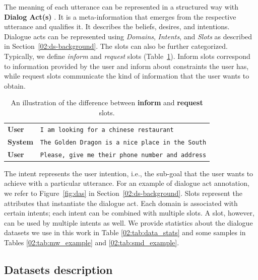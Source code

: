\begin{enumerate}
The meaning of each utterance can be represented in a structured way with \textbf{Dialog Act(s)} \cite{Weisser2016}.
It is a meta-information that emerges from the respective utterance and qualifies it. It describes the beliefs, desires, and intentions.
Dialogue acts can be represented using \emph{Domains}, \emph{Intents}, and \emph{Slots} as described in Section~\ref{02:ds-background}.
The slots can also be further categorized.
Typically, we define \emph{inform} and \emph{request} slots (Table~\ref{02:tab:inf-req}). Inform slots correspond to information provided by the user and inform about constraints the user has, while request slots communicate the kind of information that the user wants to obtain.
\begin{table}[tp]
    \centering
    \begin{tabular}{l|l}
    \toprule
         \textbf{User} & \texttt{I am looking for a {\color{cyan!80!yellow!80!black!100 }chinese} restaurant} \\
         \textbf{System} & \texttt{The Golden Dragon is a nice place in the South} \\
         \textbf{User} & \texttt{Please, give me their {\color{orange!50!yellow!90!black!100!}phone number} and {\color{orange!50!yellow!90!black!100!}address}} \\
         \bottomrule
    \end{tabular}
    \caption{An illustration of the difference between {\color{cyan!80!yellow!80!black!100 }\textbf{inform}} and {\color{orange!50!yellow!90!black!100!}\textbf{request}} slots.}
    \label{02:tab:inf-req}
\end{table}
The intent represents the user intention, i.e., the sub-goal that the user wants to achieve with a particular utterance.
For an example of dialogue act annotation, we refer to Figure~\ref{fig:das} in Section~\ref{02:ds-background}.
Slots represent the attributes that instantiate the dialogue act.
Each domain is associated with certain intents; each intent can be combined with multiple slots. A slot, however, can be used by multiple intents as well.
We provide statistics about the dialogue datasets we use in this work in Table \ref{02:tab:data_stats} and some samples in Tables \ref{02:tab:mw_example} and \ref{02:tab:smd_example}.
\end{enumerate} 

\subsection{Datasets description}
\label{02:sec:data-desc}
